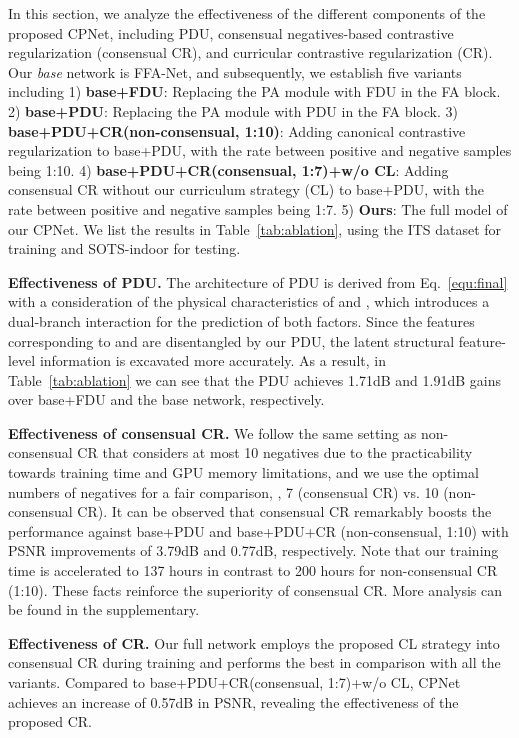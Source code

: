 In this section, we analyze the effectiveness of the different components of the proposed CPNet, including PDU, consensual negatives-based contrastive regularization (consensual CR), and curricular contrastive regularization (CR). Our \textit{base} network is FFA-Net, and subsequently, we establish five variants including 1) \textbf{base+FDU}: Replacing the PA module with FDU in the FA block. 2) \textbf{base+PDU}: Replacing the PA module with PDU in the FA block. 3) \textbf{base+PDU+CR(non-consensual, 1:10)}: Adding canonical contrastive regularization to base+PDU, with the rate between positive and negative samples being 1:10. 4) \textbf{base+PDU+CR(consensual, 1:7)+w/o CL}: Adding consensual CR without our curriculum strategy (CL) to base+PDU, with the rate between positive and negative samples being 1:7. 5) \textbf{Ours}: The full model of our CPNet. We list the results in Table~\ref{tab:ablation}, using the ITS dataset for training and SOTS-indoor for testing.


\textbf{Effectiveness of PDU.} The architecture of PDU is derived from Eq.~\eqref{equ:final} with a consideration of the physical characteristics of  and , which introduces a dual-branch interaction for the prediction of both factors. Since the features corresponding to  and  are disentangled by our PDU, the latent structural feature-level information is excavated more accurately. As a result, in Table~\ref{tab:ablation} we can see that the PDU achieves 1.71dB and 1.91dB gains over base+FDU and the base network, respectively. 

\textbf{Effectiveness of consensual CR.} 
We follow the same setting as non-consensual CR that considers at most 10 negatives due to the practicability towards training time and GPU memory limitations, and we use the optimal numbers of negatives for a fair comparison, \ie, 7 (consensual CR) vs. 10 (non-consensual CR). It can be observed that consensual CR remarkably boosts the performance against base+PDU and base+PDU+CR (non-consensual, 1:10) with PSNR improvements of 3.79dB and 0.77dB, respectively. Note that our training time is accelerated to 137 hours in contrast to 200 hours for non-consensual CR (1:10). These facts reinforce the superiority of consensual CR. More analysis can be found in the supplementary. 



\textbf{Effectiveness of CR.} Our full network employs the proposed CL strategy into consensual CR during training and performs the best in comparison with all the variants. Compared to base+PDU+CR(consensual, 1:7)+w/o CL, CPNet achieves an increase of 0.57dB in PSNR, revealing the effectiveness of the proposed CR.




